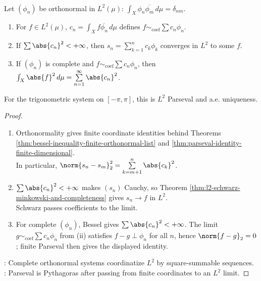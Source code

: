 \begin{theorem} \label{thm:l2-orthonormal-systems-riesz-fischer-parseval} \\
Let $(\phi_n)$ be orthonormal in $L^2(\mu)$: $\int_X\phi_n\overline{\phi_m}\,d\mu=\delta_{nm}$.
\begin{enumerate}[label=(\roman*)]
\setlength{\itemsep}{0pt}
\item For $f\in L^2(\mu)$, $c_n=\int_Xf\overline{\phi_n}\,d\mu$ defines $f\sim_{\mathrm{coef}}\sum c_n\phi_n$.
\item If $\sum\abs{c_n}^2<+\infty$, then $s_n=\sum_{k=1}^{n}c_k\phi_k$ converges in $L^2$ to some $f$.
\item If $(\phi_n)$ is complete and $f\sim_{\mathrm{coef}}\sum c_n\phi_n$, then $\int_X\abs{f}^2\,d\mu=\sum\limits_{n=1}^{\infty}\abs{c_n}^2$.
\end{enumerate}
For the trigonometric system on $[-\pi,\pi]$, this is $L^2$ Parseval and a.e. uniqueness.
\begin{proof}
\begin{enumerate}[label=(\roman*)]
\setlength{\itemsep}{0pt}
\item Orthonormality gives finite coordinate identities behind Theorems \ref{thm:bessel-inequality-finite-orthonormal-list} and \ref{thm:parseval-identity-finite-dimensional}.\\
In particular, $\norm{s_n-s_m}_2^2=\sum\limits_{k=m+1}^{n}\abs{c_k}^2$.
\item $\sum\abs{c_n}^2<+\infty$ makes $(s_n)$ Cauchy, so Theorem \ref{thm:l2-schwarz-minkowski-and-completeness} gives $s_n\to f$ in $L^2$.\\
Schwarz passes coefficients to the limit.
\item For complete $(\phi_n)$, Bessel gives $\sum\abs{c_n}^2<+\infty$. The limit $g\sim_{\mathrm{coef}}\sum c_n\phi_n$ from (ii) satisfies $f-g\perp\phi_n$ for all $n$, hence $\norm{f-g}_2=0$; finite Parseval then gives the displayed identity.
\end{enumerate}
: Complete orthonormal systems coordinatize $L^2$ by square-summable sequences.\\
: Parseval is Pythagoras after passing from finite coordinates to an $L^2$ limit.
\end{proof}
\end{theorem}

